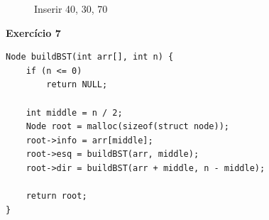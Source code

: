 \documentclass[a4paper,11pt]{article}
\begin{document}
\begin{figure}[H]
\begin{minipage}{0.49\textwidth}
		\caption{Inserir 40, 30, 70}
	\end{minipage}
\end{figure}

\newpage

\noindent \textbf{Exercício 7}
	
\begin{verbatim}
Node buildBST(int arr[], int n) {
	if (n <= 0)
		return NULL;
	
	int middle = n / 2;
	Node root = malloc(sizeof(struct node));
	root->info = arr[middle];
	root->esq = buildBST(arr, middle);
	root->dir = buildBST(arr + middle, n - middle);
	
	return root;
}
\end{verbatim}
\end{document}
